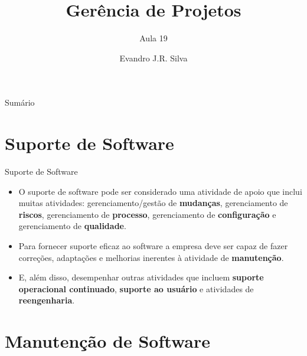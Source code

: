 \documentclass{beamer}
\title[GP 19]{Gerência de Projetos}
\subtitle{Aula 19}
\author[E.J.R. Silva]{Evandro J.R. Silva}
\date{}
\begin{document}
    
\begin{frame}
    \titlepage
\end{frame}

\begin{frame}{Sumário}
    \tableofcontents
\end{frame}


\section{Suporte de Software}

\begin{frame}{Suporte de Software}
	\begin{itemize}
		\justifying
		\item<1> O suporte de software pode ser considerado uma atividade de apoio que inclui muitas atividades: gerenciamento/gestão de \textbf{mudanças}, gerenciamento de \textbf{riscos}, gerenciamento de \textbf{processo}, gerenciamento de \textbf{configuração} e gerenciamento de \textbf{qualidade}.
		\item<2> Para fornecer suporte eficaz ao software a empresa deve ser capaz de fazer correções, adaptações e melhorias inerentes à atividade de \textbf{manutenção}.
		\item<2> E, além disso, desempenhar outras atividades que incluem \textbf{suporte operacional continuado}, \textbf{suporte ao usuário} e atividades de \textbf{reengenharia}.
	\end{itemize}
\end{frame}

\section{Manutenção de Software}
\end{document}
